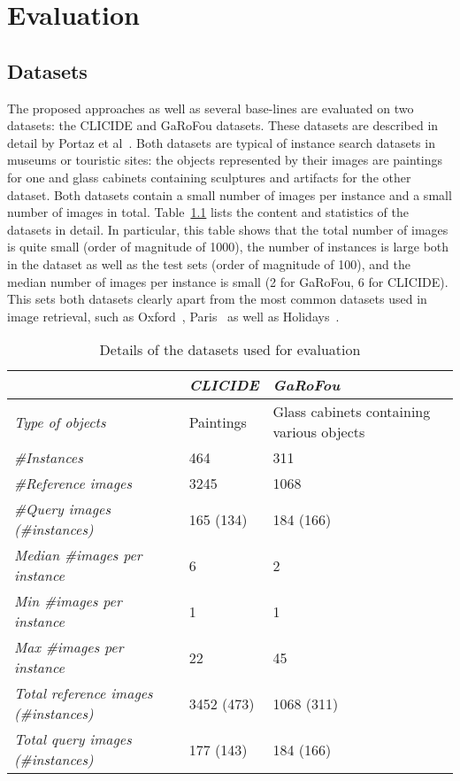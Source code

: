 
\chapter{Evaluation}\label{sec:evaluation}
\section{Datasets}\label{sec:datasets}
The proposed approaches as well as several base-lines are evaluated
on two datasets: the CLICIDE and GaRoFou datasets. These datasets are
described in detail by Portaz et al~\cite{portaz_construction_nodate}.
Both datasets are typical of instance search datasets
in museums or touristic sites: the objects represented by their images
are paintings for one and glass cabinets containing sculptures and artifacts
for the other dataset. Both datasets contain a small number of images
per instance and a small number of images in total.
Table~\ref{tab:datasets} lists the content and statistics of the datasets
in detail. In particular, this table shows that the total number of images
is quite small (order of magnitude of 1000), the number of instances
is large both in the dataset as well as the test sets (order of magnitude
of 100), and the median number of images per instance is small
(2 for GaRoFou, 6 for CLICIDE). This sets both datasets clearly apart
from the most common datasets used in image retrieval, such as
Oxford~\cite{philbin_object_2007}, Paris~\cite{philbin_lost_2008}
as well as Holidays~\cite{jegou_hamming_2008}.

\begin{table}
\begin{tabular}{|l|l|l|}
\hline & \emph{CLICIDE} & \emph{GaRoFou}\\
\hline \emph{Type of objects} & Paintings & Glass cabinets
containing various objects\\
\hline \emph{\#Instances} & 464 & 311\\
\hline \emph{\#Reference images} & 3245 & 1068\\
\hline \emph{\#Query images (\#instances)} & 165 (134) & 184 (166)\\
\hline \emph{Median \#images per instance} & 6 & 2\\
\hline \emph{Min \#images per instance} & 1 & 1\\
\hline \emph{Max \#images per instance} & 22 & 45\\
\hline \emph{Total reference images (\#instances)} & 3452 (473) & 1068 (311)\\
\hline \emph{Total query images (\#instances)} & 177 (143) & 184 (166)\\
\hline
\end{tabular}
\caption{Details of the datasets used for evaluation\label{tab:datasets}}
\end{table}

